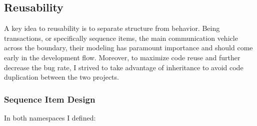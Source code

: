 \subsection{Reusability}
A key idea to reusability is to separate structure from behavior. Being transactions, or specifically sequence items, the main communication vehicle across the boundary, their modeling has paramount importance and should come early in the development flow.
Moreover, to maximize code reuse and further decrease the bug rate, I strived to take advantage of inheritance to avoid code duplication between the two projects.

\subsubsection{Sequence Item Design}
In both \dut namespaces I defined:
